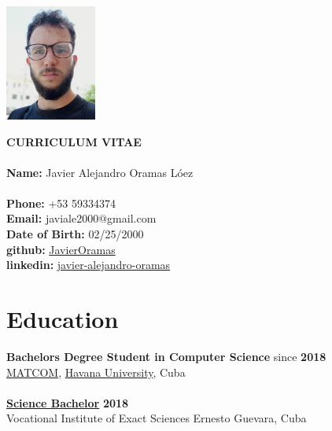 \documentclass{article}
\begin{document}
\pagestyle{empty} %

\begin{center}
    \begin{minipage}[t]{0.2\textwidth}
        \vspace{0pt}
        \includegraphics[width=3cm]{img.png}
    \end{minipage}
    \hspace{1cm}
    \begin{minipage}[t]{0.7\textwidth}
        \vspace{0pt}
        \textbf{CURRICULUM VITAE}\\\\
        \textbf{Name:} Javier Alejandro Oramas Lóez\\
        \\
        \textbf{Phone:} +53 59334374 \\
        \textbf{Email:} javiale2000@gmail.com \\
        \textbf{Date of Birth:}  02/25/2000\\
        \textbf{github:} \href{https://github.com/JavierOramas}{JavierOramas} \\
        \textbf{linkedin:} \href{https://www.linkedin.com/in/javier-alejandro-oramas-l%C3%B3pez-7ab47b160/}{javier-alejandro-oramas} \\
    \end{minipage}
\end{center}

\section*{Education}
\textbf{Bachelors Degree Student in Computer Science} \hfill since \textbf{2018}\\
\href{https://matcom.in/}{MATCOM}, \href{https://uh.cu}{Havana University}, Cuba\\
\vspace{0.1cm}\\
\textbf{\hyperref[sec:bachelor]{Science Bachelor}} \hfill \textbf{2018}\\
Vocational Institute of Exact Sciences Ernesto Guevara, Cuba
\end{document}
